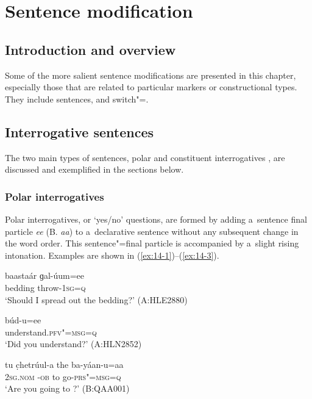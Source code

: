 \chapter{Sentence modification}
\label{chap:14}

\section{Introduction and overview}
\label{sec:14-1}


Some of the more salient sentence modifications are presented in this chapter, especially those that are related to particular markers or constructional types. They include  sentences,  and switch"=.


\section{Interrogative sentences}
\label{sec:14-2}


The two main types of  sentences, polar and constituent interrogatives \citep[290--303]{koenigsiemund2007}, are discussed and exemplified in the sections below. 


\subsection{Polar interrogatives}
\label{subsec:14-2-1}


Polar interrogatives, or `yes/no' questions, are formed by adding a~sentence final particle \textit{ee} (B. \textit{aa}) to a~declarative sentence without any subsequent change in the word order. This sentence"=final particle is accompanied by a~slight rising intonation. Examples are shown in (\ref{ex:14-1})--(\ref{ex:14-3}).

\begin{exe}
\ex
\label{ex:14-1}
\gll baastaár ɡal-úum=ee  \\
bedding throw-\textsc{1sg=q} \\
\glt `Should I spread out the bedding?' (A:HLE2880)

\ex
\label{ex:14-2}
\gll búd-u=ee \\
understand.\textsc{pfv"=msg=q} \\
\glt `Did you understand?' (A:HLN2852)

\ex
\label{ex:14-3}
\gll tu c̣hetrúul-a the ba-yáan-u=aa \\
\textsc{2sg.nom} -\textsc{ob} to go-\textsc{prs"=msg=q} \\
\glt `Are you going to ?' (B:QAA001)
\end{exe}

